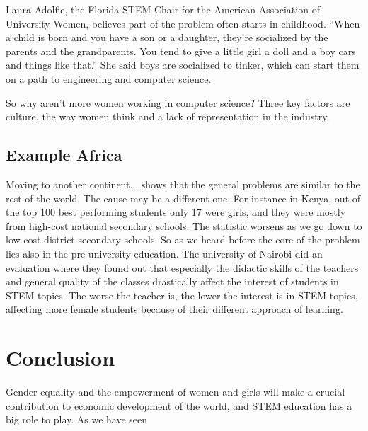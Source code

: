 	Laura Adolfie, the Florida STEM Chair for the American Association of University Women, believes part of the problem often starts in childhood. “When a child is born and you have a son or a daughter, they’re socialized by the parents and the grandparents. You tend to give a little girl a doll and a boy cars and things like that.” She said boys are socialized to tinker, which can start them on a path to engineering and computer science.
	
	So why aren’t more women working in computer science? 
	Three key factors are culture, the way women think and a lack of representation in the industry.
	
	
	\subsection{Example Africa}
	Moving to another continent... shows that the general problems are similar to the rest of the world. The cause may be a different one.
	For instance in Kenya, out of the top 100 best performing students only 17 were girls, and they were mostly from high-cost national secondary schools. 
	The statistic worsens as we go down to low-cost district secondary schools.
	So as we heard before the core of the problem lies also in the pre university education.
	The university of Nairobi did an evaluation where they found out that especially the didactic skills of the teachers and general quality of the classes drastically affect the interest of students in STEM topics. The worse the teacher is, the lower the interest is in STEM topics, affecting more female students because of their different approach of learning.
	 \cite{tafrica1} \cite{tchina1} \cite{tusa1} \cite{tgender}
	
	\section{Conclusion}
	Gender equality and the empowerment of women and girls will make a crucial contribution to economic development of the world, and STEM education has a big role to play. As we have seen